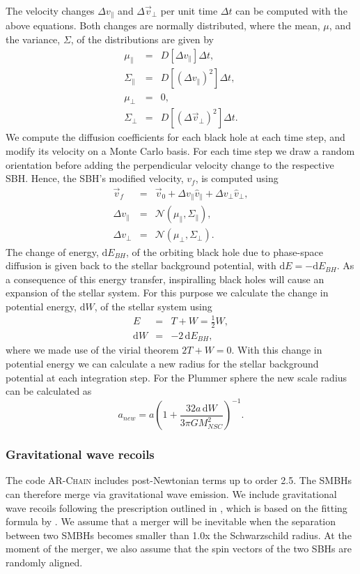 \documentclass[fleqn,usenatbib,useAMS]{mnras}
\begin{document}
The velocity changes $\Delta v_\parallel$ and $\Delta\vec{v}_\bot$ per unit time $\Delta t$ can be computed with the above equations. Both changes are normally distributed, where the mean, $\mu$, and the variance, $\Sigma$, of the distributions are given by
\begin{eqnarray}
\mu_\parallel &=& D[\Delta v_\parallel]\Delta t,\\
\Sigma_\parallel &=& D[(\Delta v_\parallel)^2]\Delta t,\\
\mu_\bot &=& 0,\\
\Sigma_\bot &=& D[(\Delta \vec{v}_\bot)^2]\Delta t.
\end{eqnarray}
We compute the diffusion coefficients for each black hole at each time step, and modify its velocity on a Monte Carlo basis. For each time step we draw a random orientation before adding the perpendicular velocity change to the respective SBH. Hence, the SBH's modified velocity, $v_f$, is computed using
\begin{eqnarray}
\vec{v}_f &=& \vec{v}_0 + \Delta v_\parallel \hat{v}_\parallel + \Delta v_\bot \hat{v}_\bot,\\
\Delta v_\parallel &=& \mathcal{N}(\mu_\parallel, \Sigma_\parallel),\\
\Delta v_\bot &=& \mathcal{N}(\mu_\bot, \Sigma_\bot).
\end{eqnarray}
The change of energy, $\mbox{d}E_{BH}$, of the orbiting black hole due to phase-space diffusion is given back to the stellar background potential, with $\mbox{d}E = -\mbox{d}E_{BH}$. As a consequence of this energy transfer, inspiralling black holes will cause an expansion of the stellar system. For this purpose we calculate the change in potential energy, $\mbox{d}W$, of the stellar system using
\begin{eqnarray}
E &=& T + W = \frac{1}{2}W,\\
\mbox{d}W &=& -2\,\mbox{d}E_{BH},
\end{eqnarray}
where we made use of the virial theorem $2T+W =0$. With this change in potential energy we can calculate a new radius for the stellar background potential at each integration step. For the Plummer sphere the new scale radius can be calculated as
\begin{equation}
a_{new} = a\left(1+\frac{32a\,\mbox{d}W}{3\pi GM_{NSC}^2}\right)^{-1}.
\end{equation}

\subsubsection{Gravitational wave recoils}
The code \textsc{AR-Chain} includes post-Newtonian terms up to order 2.5. The SMBHs can therefore merge via gravitational wave emission. We include gravitational wave recoils following the prescription outlined in \citet{2015ApJ...799..178K}, which is based on the fitting formula by \citet{2012PhRvD..85h4015L}.  We assume that a merger will be inevitable when the separation between two SMBHs becomes smaller than 1.0x the Schwarzschild radius. At the moment of the merger, we also assume that the spin vectors of the two SBHs are randomly aligned.
\end{document}
